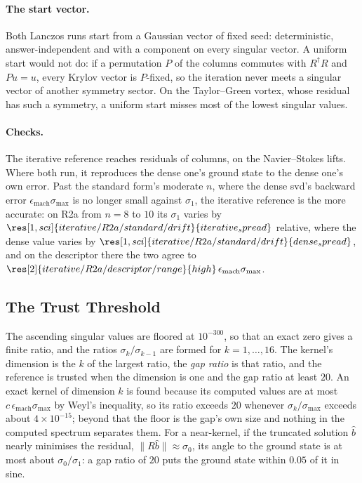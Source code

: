 \paragraph{The start vector.} Both Lanczos runs start from a Gaussian vector of fixed seed: deterministic, answer-independent and with a component on every singular vector. A uniform start would not do: if a permutation $P$ of the columns commutes with $R^\dagger R$ and $Pu=u$, every Krylov vector is $P$-fixed, so the iteration never meets a singular vector of another symmetry sector. On the Taylor--Green vortex, whose residual has such a symmetry, a uniform start misses most of the lowest singular values.

\paragraph{Checks.} The iterative reference reaches residuals of  columns, on the Navier--Stokes lifts. Where both run, it reproduces the dense one's ground state to the dense one's own error. Past the standard form's moderate $n$, where the dense \gls{svd}'s backward error $\epsilon_{\mathrm{mach}}\sigma_{\max}$ is no longer small against $\sigma_1$, the iterative reference is the more accurate: on R2a from $n=8$ to $10$ its $\sigma_1$ varies by $\res[1,sci]{iterative/R2a/standard/drift}{iterative_spread}$ relative, where the dense value varies by $\res[1,sci]{iterative/R2a/standard/drift}{dense_spread}$, and on the descriptor there the two agree to $\res[2]{iterative/R2a/descriptor/range}{high}\,\epsilon_{\mathrm{mach}}\sigma_{\max}$.

\subsection{The Trust Threshold}
\label{app:trust-threshold}

The ascending singular values are floored at $10^{-300}$, so that an exact zero gives a finite ratio, and the ratios $\sigma_k/\sigma_{k-1}$ are formed for $k=1,\dots,16$. The kernel's dimension is the $k$ of the largest ratio, the \emph{gap ratio} is that ratio, and the reference is trusted when the dimension is one and the gap ratio at least $20$. An exact kernel of dimension $k$ is found because its computed values are at most $c\,\epsilon_{\mathrm{mach}}\sigma_{\max}$ by Weyl's inequality, so its ratio exceeds $20$ whenever $\sigma_k/\sigma_{\max}$ exceeds about $4\times10^{-15}$; beyond that the floor is the gap's own size and nothing in the computed spectrum separates them. For a near-kernel, if the truncated solution $\hat b$ nearly minimises the residual, $\|R\hat b\|\approx\sigma_0$, its angle to the ground state is at most about $\sigma_0/\sigma_1$: a gap ratio of $20$ puts the ground state within $0.05$ of it in sine.

